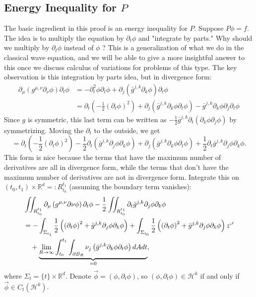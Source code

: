 \subsection{Energy Inequality for $P$}
The basic ingredient in this proof is an energy inequality for $P$. Suppose $P \phi=f$. The idea is to multiply the equation by $\partial_{t} \phi$ and "integrate by parts." Why should we multiply by $\partial_{t} \phi$ instead of $\phi$ ? This is a generalization of what we do in the classical wave equation, and we will be able to give a more insightful answer to this once we discuss calculus of variations for problems of this type. The key observation is this integration by parts idea, but in divergence form:
$$
\begin{aligned}
\partial_{\mu}\left(g^{\mu, \nu} \partial_{\nu} \phi\right) \partial_{t} \phi &=-\partial_{t}^{2} \phi \partial_{t} \phi+\partial_{j}\left(\bar{g}^{j, k} \partial_{k} \phi\right) \partial_{t} \phi \\
&=\partial_{t}\left(-\frac{1}{2}\left(\partial_{t} \phi\right)^{2}\right)+\partial_{j}\left(\bar{g}^{j, k} \partial_{k} \phi \partial_{t} \phi\right)-\bar{g}^{j, k} \partial_{k} \phi \partial_{j} \partial_{t} \phi
\end{aligned}
$$
Since $g$ is symmetric, this last term can be written as $-\frac{1}{2}\bar{g}^{j, k} \partial_{t}\left(\partial_{k} \phi \partial_{j} \phi\right)$ by symmetrizing. Moving the $\partial_{t}$ to the outside, we get
$$
=\partial_{t}\left(-\frac{1}{2}\left(\partial_{t} \phi\right)^{2}\right)-\frac{1}{2} \partial_t\left( \bar{g}^{j, k} \partial_{j} \phi \partial_{k} \phi \right)+\partial_{j}\left(\bar{g}^{j, k} \partial_{k} \phi \partial_{t} \phi\right)+\frac{1}{2} \partial_{t} \bar{g}^{j, k} \partial_{j} \phi \partial_{k} \phi.
$$
This form is nice because the terms that have the maximum number of derivatives are all in divergence form, while the terms that don't have the maximum number of derivatives are not in divergence form.
Integrate this on $\left(t_{0}, t_{1}\right) \times \mathbb{R}^{d}=: R_{t_{0}}^{t_{1}}$ (assuming the boundary term vanishes):
\begin{align*}
&\iint_{R_{t_{0}}^{t_{1}}} \partial_{\mu}\left(g^{\mu, \nu} \partial \nu \phi\right) \partial_{t} \phi-\frac{1}{2} \iint_{R_{t_{0}}^{t_{1}}} \partial_{t} \bar{g}^{j, k} \partial_{j} \phi \partial_{k} \phi \\ 
    &=-\int_{\Sigma_{t_{1}}} \frac{1}{2}\left(\left(\partial_{t} \phi\right)^{2}+\bar{g}^{j, k} \partial_{j} \phi \partial_{k} \phi\right)+\int_{\Sigma_{t_{0}}} \frac{1}{2}\left(\left(\partial_{t} \phi\right)^{2}+\bar{g}^{j, k} \partial_{j} \phi \partial_{k} \phi\right)z`' \\
    &\quad +\underbrace{\lim _{R \rightarrow \infty} \int_{t_{0}}^{t_{1}} \int_{\partial B_{R}} \nu_{j}\left(\bar{g}^{j, k} \partial_{k} \phi \partial_{t} \phi\right) d A d t}_{=0},
\end{align*}
where $\Sigma_{t}=\{t\} \times \mathbb{R}^{d}$.
Denote $\vec{\phi}=\left(\phi, \partial_{t} \phi\right)$, so $\left(\phi, \partial_{t} \phi\right) \in \mathcal{H}^{k}$ if and only if $\vec{\phi} \in C_{t}\left(\mathcal{H}^{k}\right)$.

